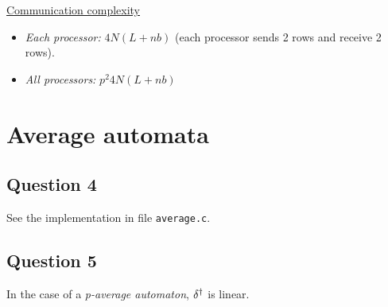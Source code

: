 \underline{Communication complexity}
\begin{itemize}
 \item \textit{Each processor:} $4N(L+nb)$ (each processor sends 2 rows and receive 2 rows).
 \item \textit{All processors:} $p^2 4N(L+nb)$
\end{itemize}


\section{Average automata}


\subsection*{Question 4}
 
 See the implementation in file \texttt{average.c}.
  

\subsection*{Question 5}
 
\begin{prop}
 In the case of a \textit{p-average automaton}, $\delta^{\dag}$ is linear.
\end{prop}


